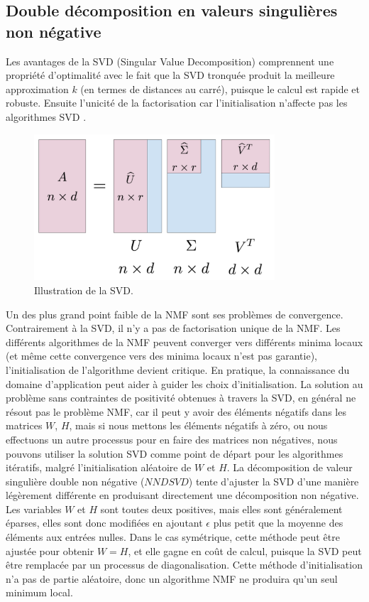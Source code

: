 \documentclass[runningheads]{llncs}
\begin{document}
\subsection{Double décomposition en valeurs singulières non négative}
Les avantages de la SVD (Singular Value Decomposition) comprennent une propriété d'optimalité avec le fait que la SVD tronquée produit la meilleure approximation $k$ (en termes de distances au carré), puisque le calcul est rapide et robuste. Ensuite l'unicité de la factorisation car l'initialisation n'affecte pas les algorithmes SVD \cite{Boutsidis2007}.


\begin{figure}[H]
\centering
\includegraphics[width=0.8\textwidth]{svd-matrices.png}
\caption{Illustration de la SVD.}
  \label{fig:svd}
\end{figure}

Un des plus grand point faible de la NMF sont ses problèmes de convergence. Contrairement à la SVD, il n'y a pas de factorisation unique de la NMF. Les différents algorithmes de la NMF peuvent converger vers différents minima locaux (et même cette convergence vers des minima locaux n'est pas garantie), l'initialisation de l'algorithme devient critique. En pratique, la connaissance du domaine d'application peut aider à guider les choix d'initialisation.
La solution au problème sans contraintes de positivité obtenues à travers la SVD, en général ne résout pas le problème NMF, car il peut y avoir des éléments négatifs dans les matrices $W$, $H$, mais si nous mettons les éléments négatifs à zéro, ou nous effectuons un autre processus pour en faire des matrices non négatives, nous pouvons utiliser la solution SVD comme point de départ pour les algorithmes itératifs, malgré l'initialisation aléatoire de $W$ et $H$. La décomposition de valeur singulière double non négative ($NNDSVD$) tente d'ajuster la SVD d'une manière légèrement différente en produisant directement une décomposition non négative. Les variables $W$ et $H$ sont toutes deux positives, mais elles sont généralement éparses, elles sont donc modifiées en ajoutant $\epsilon$ plus petit que la moyenne des éléments aux entrées nulles. Dans le cas symétrique, cette méthode peut être ajustée pour obtenir $W = H$, et elle gagne en coût de calcul, puisque la SVD peut être remplacée par un processus de diagonalisation. Cette méthode d'initialisation n'a pas de partie aléatoire, donc un algorithme NMF ne produira qu'un seul minimum local. 
\end{document}
